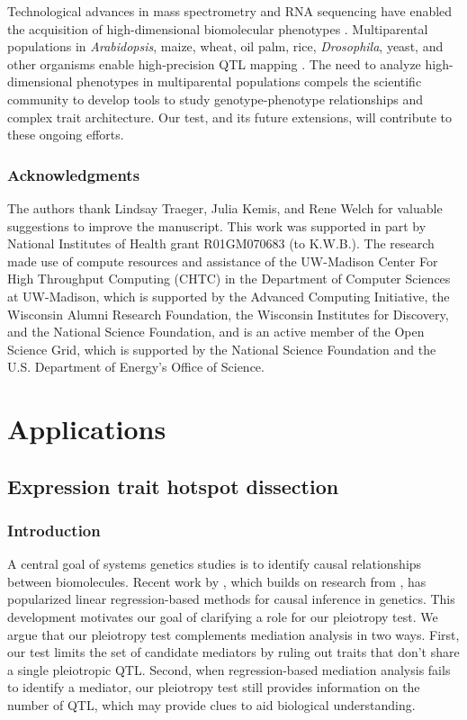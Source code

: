 \documentclass[oneside]{book}
\begin{document}
Technological advances
in mass spectrometry and RNA sequencing have enabled the acquisition of
high-dimensional biomolecular phenotypes
\citep{ozsolak2011rna,han2012multi}. Multiparental populations in
\textit{Arabidopsis}, maize, wheat, oil palm, rice,
\textit{Drosophila}, yeast, and other organisms enable high-precision
QTL mapping \citep{yu2008genetic, tisne2017identification,
  stanley2017genetic, raghavan2017approaches, mackay2012drosophila,
  kover2009multiparent, cubillos2013high}. The need to analyze
high-dimensional phenotypes in multiparental populations compels the
scientific community to develop tools to study genotype-phenotype
relationships and complex trait architecture. Our test, and its future
extensions, will contribute to these ongoing efforts.




\subsection*{Acknowledgments}

The authors thank Lindsay Traeger, Julia Kemis, and Rene Welch for
valuable suggestions to improve the manuscript. This work was
supported in part by National Institutes of Health grant R01GM070683
(to K.W.B.). The research made use of compute resources and assistance
of the UW-Madison Center For High Throughput Computing (CHTC) in the
Department of Computer Sciences at UW-Madison, which is supported by
the Advanced Computing Initiative, the Wisconsin Alumni Research
Foundation, the Wisconsin Institutes for Discovery, and the National
Science Foundation, and is an active member of the Open Science Grid,
which is supported by the National Science Foundation and the U.S.
Department of Energy's Office of Science.

\chapter{Applications}
\section{Expression trait hotspot dissection}
\subsection{Introduction}

A central goal of systems genetics studies is to identify causal relationships between biomolecules. 
Recent work by \citet{chick2016defining}, which builds on research from \citet{baron1986moderator}, has popularized linear regression-based methods for causal inference in genetics. 
This development motivates our goal of clarifying a role for our pleiotropy test. 
We argue that our pleiotropy test complements mediation analysis in two ways. 
First, our test limits the set of candidate mediators by ruling out traits that don't share a single pleiotropic QTL. 
Second, when regression-based mediation analysis fails to identify a mediator, our pleiotropy test still provides information on the number of QTL, which may provide clues to aid biological understanding.
\end{document}

